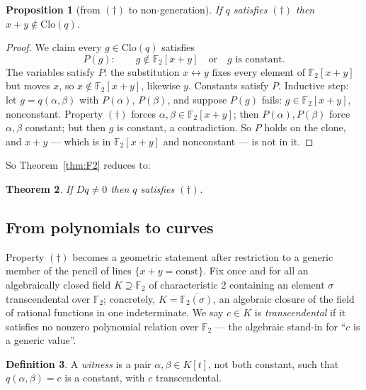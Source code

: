 \documentclass[11pt]{article}
\newtheorem{theorem}{Theorem}[section]
\newtheorem{proposition}[theorem]{Proposition}
\theoremstyle{definition}
\newtheorem{definition}[theorem]{Definition}
\theoremstyle{remark}
\newcommand{\F}{\mathbb{F}}
\newcommand{\Clo}{\mathrm{Clo}}
\begin{document}
\begin{proposition}[from $(\dagger)$ to non-generation]\label{prop:master}
If $q$ satisfies $(\dagger)$ then $x + y \notin \Clo(q)$.
\end{proposition}

\begin{proof}
We claim every $g \in \Clo(q)$ satisfies
\[
  P(g): \qquad g \notin \F_2[x{+}y]
  \quad\text{or}\quad g \text{ is constant.}
\]
The variables satisfy $P$: the substitution $x \leftrightarrow y$
fixes every element of $\F_2[x{+}y]$ but moves $x$, so
$x \notin \F_2[x{+}y]$, likewise $y$.  Constants satisfy $P$.
Inductive step: let $g = q(\alpha,\beta)$ with $P(\alpha)$,
$P(\beta)$, and suppose $P(g)$ fails: $g \in \F_2[x{+}y]$,
nonconstant.  Property $(\dagger)$ forces
$\alpha, \beta \in \F_2[x{+}y]$; then
$P(\alpha), P(\beta)$ force $\alpha, \beta$ constant; but then $g$ is
constant, a contradiction.  So $P$ holds on the clone, and $x+y$ ---
which is in $\F_2[x{+}y]$ and nonconstant --- is not in it.
\end{proof}

So Theorem~\ref{thm:F2} reduces to:

\begin{theorem}\label{thm:tame}
If $Dq \neq 0$ then $q$ satisfies $(\dagger)$.
\end{theorem}

\subsection{From polynomials to curves}\label{sec:bridge}

Property $(\dagger)$ becomes a geometric statement after restriction
to a generic member of the pencil of lines $\{x + y = \text{const}\}$.  Fix once
and for all an algebraically closed field $K \supseteq \F_2$ of
characteristic $2$ containing an element $\sigma$ transcendental over
$\F_2$; concretely, $K = \overline{\F_2(\sigma)}$, an algebraic
closure of the field of rational functions in one indeterminate.  We
say $c \in K$ is \emph{transcendental} if it satisfies no nonzero
polynomial relation over $\F_2$ --- the algebraic stand-in for ``$c$
is a generic value''.

\begin{definition}\label{def:witness}
A \emph{witness} is a pair $\alpha, \beta \in K[t]$, not both
constant, such that $q(\alpha, \beta) = c$ is a constant, with $c$
transcendental.
\end{definition}
\end{document}
